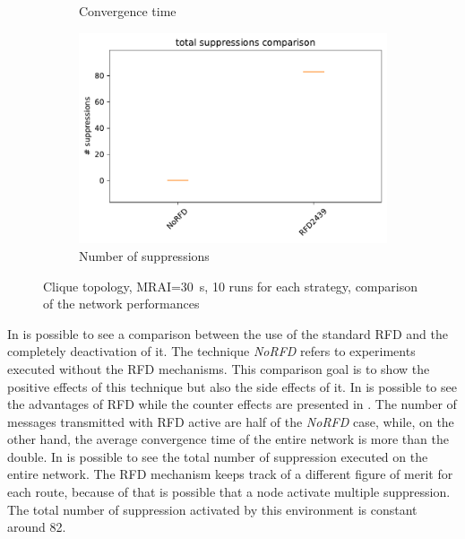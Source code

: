 \begin{figure}[h]
\begin{subfigure}[b]{0.49\textwidth}
         \caption{Convergence time}
         \label{fig:RFD_2439_clique_MRAI30_convTime}
     \end{subfigure}
     \hfill
     \begin{subfigure}[b]{0.49\textwidth}
         \centering
         \includegraphics[width=\textwidth]{images/RFD/clique/clique_rfd_comparison_2439_suppressions_boxplot.pdf}
         \caption{Number of suppressions}
         \label{fig:RFD_2439_clique_MRAI30_suppressions}
     \end{subfigure}
		\caption{Clique topology, \ac{MRAI}=\SI{30}{\second}, \num{10} runs for each strategy,
				comparison of the network performances}
        \label{fig:RFD_2439_MRAI30}
\end{figure}

In  is possible to see a comparison between the use
of the standard \ac{RFD} and the completely deactivation of it.
The technique \textit{NoRFD} refers to experiments executed without the
\ac{RFD} mechanisms.
This comparison goal is to show the positive effects of this technique but also
the side effects of it.
In  is possible to see the advantages
of \ac{RFD} while the counter effects are presented in .
The number of messages transmitted with \ac{RFD} active are half of the \textit{NoRFD}
case, while, on the other hand, the average convergence time of the entire network
is more than the double.
In  is possible to see the total
number of suppression executed on the entire network.
The \ac{RFD} mechanism keeps track of a different figure of merit for each route,
because of that is possible that a node activate multiple suppression.
The total number of suppression activated by this environment is constant around
\num{82}.

